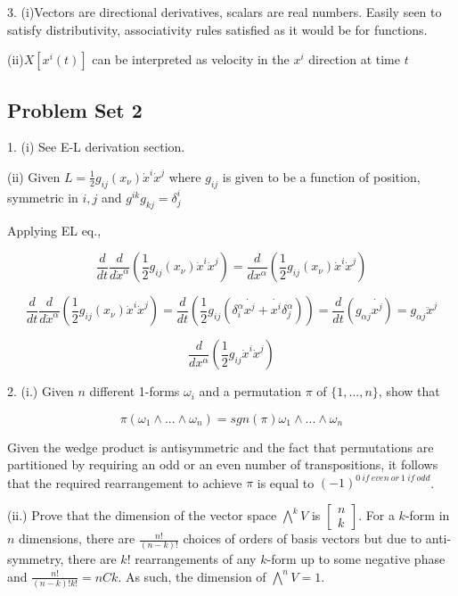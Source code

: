 \documentclass{article}\usepackage[]{graphicx}\usepackage[]{color}
\begin{document}
3. (i)Vectors are directional derivatives, scalars are real numbers. Easily seen to satisfy distributivity, associativity rules satisfied as it would be for functions.

(ii)$X[x^i(t)]$ can be interpreted as velocity in the $x^i$ direction at time $t$

\pagebreak

\subsection{Problem Set 2}

1. (i) See E-L derivation section. %

(ii) Given $L=\frac{1}{2}g_{ij}(x_{\nu})\dot{x}^i\dot{x}^j$ where $g_{ij}$ is given to be a function of position, symmetric in $i,j$ and $g^{ik}g_{kj}=\delta^i_j$

Applying EL eq.,

$$
\frac{d}{dt}\frac{d}{d\dot{x}^{\alpha}}\left(
\frac{1}{2}g_{ij}(x_{\nu})\dot{x}^i\dot{x}^j
\right)=\frac{d}{dx^{\alpha}}\left(
\frac{1}{2}g_{ij}(x_{\nu})\dot{x}^i\dot{x}^j
\right)
$$


$$
\frac{d}{dt}\frac{d}{d\dot{x}^{\alpha}}\left(
\frac{1}{2}g_{ij}(x_{\nu})\dot{x}^i\dot{x}^j
\right)= \frac{d}{dt}\left( \frac{1}{2}g_{ij}(\delta^{\alpha}_{i}\dot{x^j}+\dot{x^i}\delta^{\alpha}_{j})\right)=\frac{d}{dt}\left( g_{\alpha j}\dot{x^j}\right)=g_{\alpha j}\ddot{x}^j
$$

$$
\frac{d}{dx^{\alpha}}\left(
\frac{1}{2}g_{ij}\dot{x}^i\dot{x}^j
\right)
$$


2. (i.) Given $n$ different 1-forms $\omega_i$ and a permutation $\pi$ of $\lbrace 1,...,n\rbrace$, show that 

$$
\pi(\omega_1\wedge ... \wedge \omega_n)= sgn(\pi)\omega_1\wedge...\wedge\omega_n
$$

Given the wedge product is antisymmetric and the fact that permutations are partitioned by requiring an odd or an even number of transpositions, it follows that the required rearrangement to achieve $\pi$ is equal to $(-1)^{0\ if\ even \ or\ 1\ if \ odd}$.



(ii.) Prove that the dimension of the vector space $\bigwedge^k V$ is 
$\begin{bmatrix}
n \\
k
\end{bmatrix}
$.
For a $k$-form in $n$ dimensions, there are $\frac{n!}{(n-k)!}$ choices of orders of basis vectors but due to anti-symmetry,   
there are $k!$ rearrangements of any $k$-form up to some negative phase and $\frac{n!}{(n-k)!k!}=nCk$. As such, the dimension of $\bigwedge^n V=1$.
\end{document}
